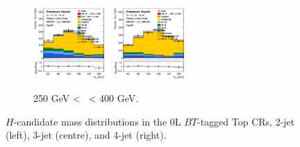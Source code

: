 \begin{figure}[h!]
\begin{subfigure}[b]{\textwidth}
        \includegraphics[width=0.32\textwidth]{Images/VH/Own_fit/postfit_VHcc/Region_distmBB_BMax400_BMin250_DtopCRBC_J3_TTypebt_T1_L0_Y6051_GlobalFit_conditionnal_mu1.png}
        \includegraphics[width=0.32\textwidth]{Images/VH/Own_fit/postfit_VHbb/Region_distmBB_BMax400_BMin250_DtopCRBC_J4_TTypebt_T1_L0_Y6051_GlobalFit_conditionnal_mu1.png} %
        \caption{250 GeV < \ptv\ < 400 GeV.}
        \label{fig:plots_VHcc_OL_250_TopCR_2c}
    \end{subfigure}
    \caption{$H$-candidate mass distributions in the 0L $BT$-tagged Top CRs, 2-jet (left), 3-jet (centre), and 4-jet (right).}
    \label{fig:plots_VHcc_OL_TopCR_2c}
\end{figure} 

\vspace*{\fill} \newpage
\vspace*{\fill} 

